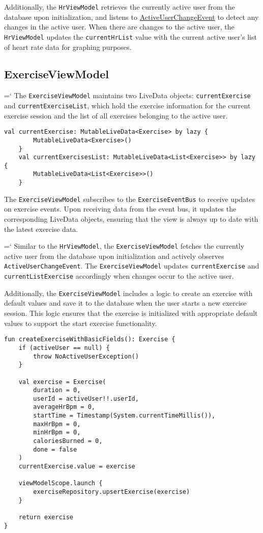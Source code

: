 Additionally, the \verb;HrViewModel; retrieves the currently active user from the database upon initialization, and listens to \url{ActiveUserChangeEvent} to detect any changes in the active user.
When there are changes to the active user, the \verb;HrViewModel; updates the \verb;currentHrList; value with the current active user's list of heart rate data for graphing purposes.

\subsection{ExerciseViewModel}
\label{chap:exerciseviewmodel_impl}
{{\ttfamily \hyphenchar\the\font=`\-}
The \verb;ExerciseViewModel; maintains two LiveData objects: \texttt{currentExercise} and \texttt{currentExerciseList}, which hold the exercise information for the current exercise session and the list of all exercises belonging to the active user. 
\par}

\begin{lstlisting}[caption={LiveData implementation (Kotlin - ExerciseViewModel)}]
    val currentExercise: MutableLiveData<Exercise> by lazy {
        MutableLiveData<Exercise>()
    }
    val currentExercisesList: MutableLiveData<List<Exercise>> by lazy {
        MutableLiveData<List<Exercise>>()
    }
\end{lstlisting}
The \verb;ExerciseViewModel; subscribes to the \verb;ExerciseEventBus; to receive updates on exercise events. Upon receiving data from the event bus, it updates the corresponding LiveData objects, ensuring that the view is always up to date with the latest exercise data.

{{\ttfamily \hyphenchar\the\font=`\-}
Similar to the \verb;HrViewModel;, the \verb;ExerciseViewModel; fetches the currently active user from the database upon initialization and actively observes \texttt{ActiveUserChangeEvent}.
The \verb;ExerciseViewModel; updates \verb;currentExercise; and \texttt{currentListExercise} accordingly when changes occur to the active user.
\par}

Additionally, the \verb;ExerciseViewModel; includes a logic to create an exercise with default values and save it to the database when the user starts a new exercise session. This logic ensures that the exercise is initialized with appropriate default values to support the start exercise functionality.
\begin{lstlisting}[caption={Create default exercise function (Kotlin - ExerciseViewModel)}]
fun createExerciseWithBasicFields(): Exercise {
    if (activeUser == null) {
        throw NoActiveUserException()
    }

    val exercise = Exercise(
        duration = 0,
        userId = activeUser!!.userId,
        averageHrBpm = 0,
        startTime = Timestamp(System.currentTimeMillis()),
        maxHrBpm = 0,
        minHrBpm = 0,
        caloriesBurned = 0,
        done = false
    )
    currentExercise.value = exercise

    viewModelScope.launch {
        exerciseRepository.upsertExercise(exercise)
    }

    return exercise
}
\end{lstlisting}

